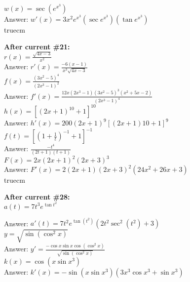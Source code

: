 \documentclass[11pt]{report}
\newlength\tindent
\renewcommand{\indent}{\hspace*{\tindent}}
\begin{document}
$w(x) = \sec (e^{x^3})$\\

\indent Answer: $w'(x) = 3x^2 e^{x^3}(\sec e^{x^3})(\tan e^{x^3})$\\
 truecm


\textbf{After current \#21:}\\
$\displaystyle{r(x) = \frac{\sqrt {4x-3}}{x^2}}$\\

\indent Answer: $\displaystyle{r'(x) = \frac{-6(x-1)}{x^3 \sqrt {4x-3}}}$\\


$\displaystyle{f(x) = \frac {(3x^2 - 5)^4}{(2x^3-1)^2}}$\\

\indent Answer: $\displaystyle{f'(x) = \frac {12x(2x^3-1)(3x^2 - 5)^3(x^2+5x-2)}{(2x^3-1)^4}}$\\
$h(x)=[(2x+1)^{10} + 1]^{10}$\\

\indent Answer: $h'(x)=200(2x+1)^9[(2x+1){10}+1]^9$\\

$\displaystyle{f(t)=\left[\left(1+ \frac{1}{t}\right)^{-1} + 1\right]^{-1}}$\\

\indent Answer: $\displaystyle{\frac{-t^4}{(2t+1)(t+1)}}$\\

$F(x)=2x(2x+1)^2 (2x+3)^3$\\

\indent Answer: $F'(x)=2(2x+1)(2x+3)^2(24x^2+26x+3)$\\
 truecm

\textbf{After current \#28:}\\

$a(t) = 7t^3e^{\tan t^2}$

\indent Answer: $a'(t)=7t^2 e^{\tan (t^2)}(2t^2 \sec^2 (t^2) + 3)$\\

$y=\sqrt{\sin (\cos^2 x)}$\\

\indent Answer: $\displaystyle{y'=\frac{-\cos x \sin x \cos (\cos^2 x)}{\sqrt{\sin (\cos^2 x)}}}$\\


$k(x) = \cos(x\sin x^3)$\\

\indent Answer: $k'(x) = -\sin(x\sin x^3)(3x^3\cos x^3 + \sin x^3)$\\
\end{document}
